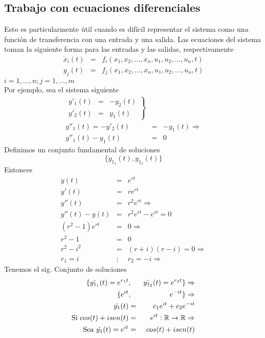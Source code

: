 \documentclass[12pt,spanish,lettersize]{report}
\begin{document}
\subsection{Trabajo con ecuaciones diferenciales}
Esto es particularmente \'util cuando es dif\'icil representar el sistema como una funci\'on de transferencia con una entrada y una salida.
Las ecuaciones del sistema toman la siguiente forma para las entradas y las salidas, respectivamente
\begin{eqnarray}
\dot{x}_i(t)&=&f_i(x_1,x_2,\dots,x_n,u_1,u_2,\dots,u_n,t)\\
y_j(t)&=&f_j(x_1,x_2,\dots,x_n,u_1,u_2,\dots,u_n,t) \end{eqnarray}
$i=1,\dots,n; j=1,\dots,m$\\
Por ejemplo, sea el sistema siguiente
\begin{eqnarray}
\nonumber\left.
\begin{array}{ccc}
y'_1(t) & = & -y_2(t)\\
y'_2(t) & = & y_1(t)
\end{array}
\right\}\\
\nonumber y''_1(t) = -y'_2(t)&=&-y_1(t)\Rightarrow\\
\nonumber y''_1(t) - y_1(t)&=&0
\end{eqnarray}
Definimos un conjunto fundamental de soluciones
\begin{equation}
\{y_{1_1}(t), y_{1_2}(t)\}
\end{equation}
Entonces
\begin{eqnarray}
\nonumber y(t)&=&e^{rt}\\
\nonumber y'(t)&=&re^{rt}\\
\nonumber y''(t)&=&r^2e^{rt}\Rightarrow\\
\nonumber y''(t)-y(t)&=&r^2e^{rt}-e^{rt}=0\\
\nonumber (r^2-1)e^{rt}&=&0\Rightarrow\\
\nonumber r^2-1&=&0\\
\nonumber r^2-i^2&=&(r+i)(r-i) = 0\Rightarrow\\
\nonumber r_1=i&;&r_2 = -i\Rightarrow
\end{eqnarray}
Tenemos el sig. Conjunto de soluciones
\begin{eqnarray}
\nonumber \{\tilde{y_{1_1}}(t)=e^{r_1t}&,&\tilde{y_{1_2}}(t) = e^{r_2t}\}\Rightarrow\\
\nonumber \{e^{it}&,&e^{-it}\}\Rightarrow\\
\nonumber \tilde{y_1}(t)&=&c_1e^{it}+c_2e^{-it}\\
\nonumber \textnormal{Si } cos(t)+isen(t)&=&e^{it}:\mathbb{R}\rightarrow\mathbb{R}\Rightarrow\\
\nonumber\textnormal{Sea }\tilde{y_1}(t)=e^{it}&=&cos(t)+isen(t)
\end{eqnarray}
\end{document}
